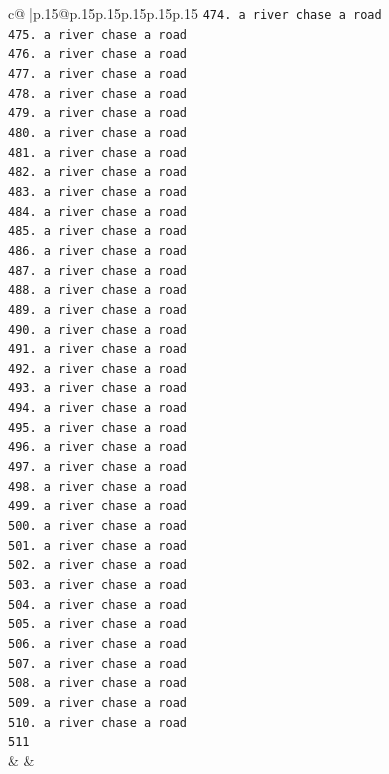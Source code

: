 \documentclass{article}
\begin{document}
{\begin{supertabular}{c@{$\;$}|p{.15\linewidth}@{}p{.15\linewidth}p{.15\linewidth}p{.15\linewidth}p{.15\linewidth}p{.15\linewidth}}
{{{\texttt{474. a river chase a road} \\
\texttt{475. a river chase a road} \\
\texttt{476. a river chase a road} \\
\texttt{477. a river chase a road} \\
\texttt{478. a river chase a road} \\
\texttt{479. a river chase a road} \\
\texttt{480. a river chase a road} \\
\texttt{481. a river chase a road} \\
\texttt{482. a river chase a road} \\
\texttt{483. a river chase a road} \\
\texttt{484. a river chase a road} \\
\texttt{485. a river chase a road} \\
\texttt{486. a river chase a road} \\
\texttt{487. a river chase a road} \\
\texttt{488. a river chase a road} \\
\texttt{489. a river chase a road} \\
\texttt{490. a river chase a road} \\
\texttt{491. a river chase a road} \\
\texttt{492. a river chase a road} \\
\texttt{493. a river chase a road} \\
\texttt{494. a river chase a road} \\
\texttt{495. a river chase a road} \\
\texttt{496. a river chase a road} \\
\texttt{497. a river chase a road} \\
\texttt{498. a river chase a road} \\
\texttt{499. a river chase a road} \\
\texttt{500. a river chase a road} \\
\texttt{501. a river chase a road} \\
\texttt{502. a river chase a road} \\
\texttt{503. a river chase a road} \\
\texttt{504. a river chase a road} \\
\texttt{505. a river chase a road} \\
\texttt{506. a river chase a road} \\
\texttt{507. a river chase a road} \\
\texttt{508. a river chase a road} \\
\texttt{509. a river chase a road} \\
\texttt{510. a river chase a road} \\
\texttt{511} \\
            }
        }
    }
    & & \\ \\


\end{supertabular}}
\end{document}
